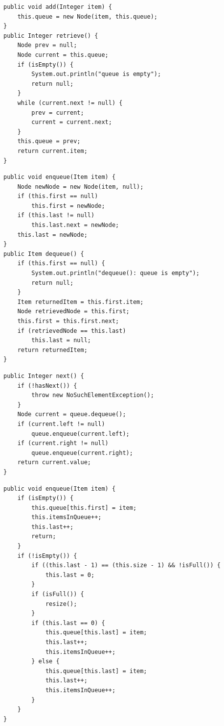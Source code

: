 \documentclass[a4paper,11pt]{article}
\newenvironment{code}{\captionsetup{type=listing}}{}
\begin{document}
\begin{code}
    \label{code:queueNoLast}
    \begin{verbatim}
public void add(Integer item) {
    this.queue = new Node(item, this.queue);
}
public Integer retrieve() {
    Node prev = null;
    Node current = this.queue;
    if (isEmpty()) {
        System.out.println("queue is empty");
        return null;
    }
    while (current.next != null) {
        prev = current;
        current = current.next;
    }
    this.queue = prev;
    return current.item;
}
\end{verbatim}
\end{code}

\begin{code}
    \label{code:queue}
    \begin{verbatim}
public void enqueue(Item item) {
    Node newNode = new Node(item, null);
    if (this.first == null)
        this.first = newNode;
    if (this.last != null)
        this.last.next = newNode;
    this.last = newNode;
}
public Item dequeue() {
    if (this.first == null) {
        System.out.println("dequeue(): queue is empty");
        return null;
    }
    Item returnedItem = this.first.item;
    Node retrievedNode = this.first;
    this.first = this.first.next;
    if (retrievedNode == this.last)
        this.last = null;
    return returnedItem;
}
\end{verbatim}
\end{code}

\begin{code}
    \label{code:iterator}
    \begin{verbatim}
public Integer next() {
    if (!hasNext()) {
        throw new NoSuchElementException();
    }
    Node current = queue.dequeue();
    if (current.left != null)
        queue.enqueue(current.left);
    if (current.right != null)
        queue.enqueue(current.right);
    return current.value;
}
\end{verbatim}
\end{code}

\begin{code}
    \label{code:arrayAdd}
    \begin{verbatim}
public void enqueue(Item item) {
    if (isEmpty()) {
        this.queue[this.first] = item;
        this.itemsInQueue++;
        this.last++;
        return;
    }
    if (!isEmpty()) {
        if ((this.last - 1) == (this.size - 1) && !isFull()) {
            this.last = 0;
        }
        if (isFull()) {
            resize();
        }
        if (this.last == 0) {
            this.queue[this.last] = item;
            this.last++;
            this.itemsInQueue++;
        } else {
            this.queue[this.last] = item;
            this.last++;
            this.itemsInQueue++;
        }
    }
}
\end{verbatim}
\end{code}
\end{document}
